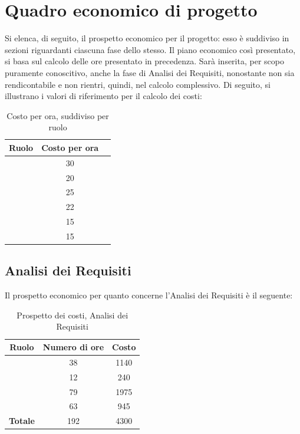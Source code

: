 \newpage

\section{Quadro economico di progetto}
Si elenca, di seguito, il prospetto economico per il progetto: esso è suddiviso in sezioni riguardanti ciascuna fase dello stesso. Il piano economico così presentato, si basa sul calcolo delle ore presentato in precedenza. Sarà inserita, per scopo puramente conoscitivo, anche la fase di Analisi dei Requisiti, nonostante non sia rendicontabile e non rientri, quindi, nel calcolo complessivo. Di seguito, si illustrano i valori di riferimento per il calcolo dei costi:

\begin{table}[H]
	\begin{center}
		\begin{tabular}{|c|c|c|}
			\hline
			\textbf{Ruolo}	& \textbf{Costo per ora} \\
			\hline
			\Res	&	30	\\
			\hline
			\Amm	&	20	\\
			\hline
			\Ana	&	25	\\
			\hline
			\Prog	&	22	\\
			\hline
			\Progr	&	15	\\
			\hline
			\Ver	&	15	\\
			\hline
		\end{tabular}
	\end{center}
	\caption{Costo per ora, suddiviso per ruolo}
\end{table}

\subsection{Analisi dei Requisiti}
Il prospetto economico per quanto concerne l'Analisi dei Requisiti è il seguente:


\begin{table}[H]
	\begin{center}
		\begin{tabular}{|c|c|c|}
			\hline
			\textbf{Ruolo}	& \textbf{Numero di ore} & \textbf{Costo} \\
			\hline
			\Res	&	38  &	1140	\\
			\hline
			\Amm	&	12  &	240	\\
			\hline
			\Ana	&	79  &	1975	\\
			\hline
			\Ver	&	63  &	945	\\
			\hline
			\textbf{Totale}  &	192	&	4300	\\
			\hline
		\end{tabular}
	\end{center}
	\caption{Prospetto dei costi, Analisi dei Requisiti }
\end{table}

